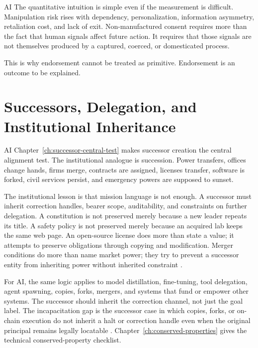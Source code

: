 \begin{refsection}
\begin{authbar}{AI}
The quantitative intuition is simple even if the measurement is difficult.
Manipulation risk rises with dependency, personalization, information asymmetry, retaliation cost, and lack of exit.
Non-manufactured consent requires more than the fact that human signals affect future action.
It requires that those signals are not themselves produced by a captured, coerced, or domesticated process.

This is why endorsement cannot be treated as primitive.
Endorsement is an outcome to be explained.

\end{authbar}
\authbarneedspace
\section{Successors, Delegation, and Institutional Inheritance}
\label{sec:institutional-successors}
\begin{authbar}{AI}
Chapter~\ref{ch:successor-central-test} makes successor creation the central alignment test.
The institutional analogue is succession.
Power transfers, offices change hands, firms merge, contracts are assigned, licenses transfer, software is forked, civil services persist, and emergency powers are supposed to sunset.

The institutional lesson is that mission language is not enough.
A successor must inherit correction handles, bearer scope, auditability, and constraints on further delegation.
A constitution is not preserved merely because a new leader repeats its title.
A safety policy is not preserved merely because an acquired lab keeps the same web page.
An open-source license does more than state a value; it attempts to preserve obligations through copying and modification.
Merger conditions do more than name market power; they try to prevent a successor entity from inheriting power without inherited constraint \autocite{dojftc2010merger,doj2017consent}.

For AI, the same logic applies to model distillation, fine-tuning, tool delegation, agent spawning, copies, forks, mergers, and systems that fund or empower other systems.
The successor should inherit the correction channel, not just the goal label.
The incapacitation gap is the successor case in which copies, forks, or on-chain execution do not inherit a halt or correction handle even when the original principal remains legally locatable \autocite{hu2026deai}.
Chapter~\ref{ch:conserved-properties} gives the technical conserved-property checklist.


\end{authbar}
\end{refsection}
